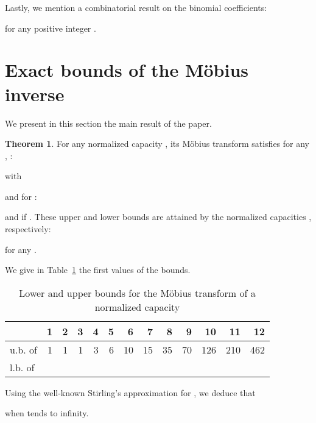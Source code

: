\documentclass[12pt,a4paper]{article}
\theoremstyle{definition}
\newtheorem{theorem}{Theorem}
\theoremstyle{remark}
\begin{document}
Lastly, we mention a combinatorial result on the binomial coefficients:

for any positive integer .

\section{Exact bounds of the M\"obius inverse}
We present in this section the main result of the paper.

\begin{theorem}\label{th:2.boundM}
For any normalized capacity , its M\"obius transform satisfies for any
, :

with

and for :

and  if .
These upper and  lower bounds are attained by the normalized capacities
, respectively:

for any .
\end{theorem}

We give in Table~\ref{tab:2.mobb} the first values of the bounds.
\begin{table}[htb]
\begin{tabular}{|l|rrrrrrrrrrrr|}\hline
 & 1 & 2 & 3 & 4 & 5 & 6 & 7 & 8 & 9 & 10 & 11 & 12\\ \hline
u.b. of  & 1 & 1 & 1 & 3 & 6 & 10 & 15 & 35 & 70 & 126 & 210 & 462\\ \hline
l.b. of  &  &  &  &  &  &  &  &  &  &
 &  &  \\ \hline
\end{tabular}
\caption{Lower and upper bounds for the M\"obius transform of a normalized
  capacity}
\label{tab:2.mobb}
\end{table}
Using the well-known Stirling's approximation
 for , we
deduce that

when  tends to infinity.
\end{document}
